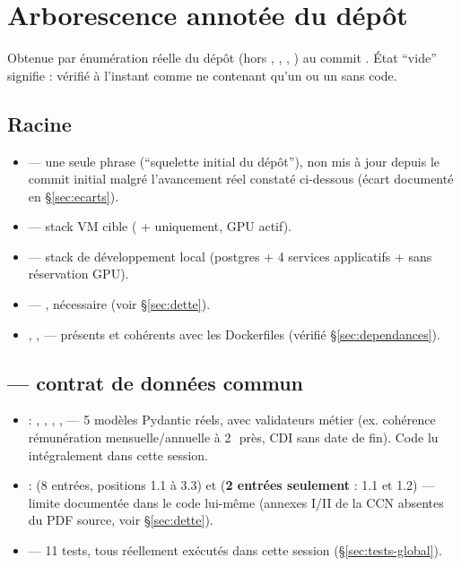 \documentclass[11pt,a4paper]{article}
\begin{document}
\section{Arborescence annot\'ee du d\'ep\^ot}

Obtenue par \'enum\'eration r\'eelle du d\'ep\^ot (hors , , , ) au commit . \'Etat ``vide'' signifie : v\'erifi\'e \`a l'instant comme ne contenant qu'un  ou un  sans code.

\subsection*{Racine}
\begin{itemize}[leftmargin=1.3em]
\item {} --- une seule phrase (``squelette initial du d\'ep\^ot''), non mis \`a jour depuis le commit initial  malgr\'e l'avancement r\'eel constat\'e ci-dessous (\'ecart document\'e en \S\ref{sec:ecarts}).
\item {} --- stack VM cible ( +  uniquement, GPU actif).
\item {} --- stack de d\'eveloppement local (postgres + 4 services applicatifs +  sans r\'eservation GPU).
\item {} --- , n\'ecessaire (voir \S\ref{sec:dette}).
\item {}, ,  --- pr\'esents et coh\'erents avec les Dockerfiles (v\'erifi\'e \S\ref{sec:dependances}).
\end{itemize}

\subsection*{ --- contrat de donn\'ees commun}
\begin{itemize}[leftmargin=1.3em]
\item {} : , , , ,  --- 5 mod\`eles Pydantic r\'eels, avec validateurs m\'etier (ex. coh\'erence r\'emun\'eration mensuelle/annuelle \`a 2\,\texteuro\ pr\`es, CDI sans date de fin). Code lu int\'egralement dans cette session.
\item {} :  (8 entr\'ees, positions 1.1 \`a 3.3) et  (\textbf{2 entr\'ees seulement} : 1.1 et 1.2) --- limite document\'ee dans le code lui-m\^eme (annexes I/II de la CCN absentes du PDF source, voir \S\ref{sec:dette}).
\item {} --- 11 tests, tous r\'eellement ex\'ecut\'es dans cette session (\S\ref{sec:tests-global}).
\end{itemize}
\end{document}
